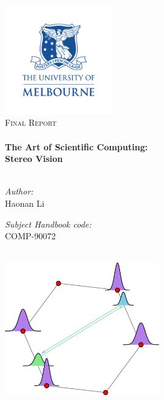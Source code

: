 \begin{titlepage}
\begin{center}

\includegraphics[width=0.35\textwidth]{figures/uom_banner.pdf}~\\[0.3cm]

\textsc{\Large Final Report}\\[0.3cm]

\HRule \\[0.3cm]
{ \huge \bfseries The Art of Scientific Computing:\\
Stereo Vision}\\[0.3cm]

\HRule \\[0.8cm]

\begin{minipage}{0.45\textwidth}
\begin{flushleft} \large
\textit{Author:}\\
Haonan Li
\end{flushleft}
\end{minipage}
\begin{minipage}{0.45\textwidth}
\begin{flushright} \large
\textit{Subject Handbook code:}\\
COMP-90072
\end{flushright}
\end{minipage}
\\[1.0cm]

\includegraphics[width=0.50\textwidth]{figures/coulomb_direct.pdf}~\\[0.5cm]


\end{center}
\end{titlepage}
